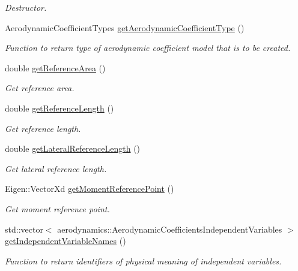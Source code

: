 \begin{DoxyCompactItemize}
\begin{DoxyCompactList}\small\item\em Destructor. \end{DoxyCompactList}\item 
Aerodynamic\+Coefficient\+Types \hyperlink{classtudat_1_1simulation__setup_1_1AerodynamicCoefficientSettings_ac9cdc44679a42e11702489a3720b1e97}{get\+Aerodynamic\+Coefficient\+Type} ()
\begin{DoxyCompactList}\small\item\em Function to return type of aerodynamic coefficient model that is to be created. \end{DoxyCompactList}\item 
double \hyperlink{classtudat_1_1simulation__setup_1_1AerodynamicCoefficientSettings_a435aa9070052b7442625e9ad010e4c57}{get\+Reference\+Area} ()
\begin{DoxyCompactList}\small\item\em Get reference area. \end{DoxyCompactList}\item 
double \hyperlink{classtudat_1_1simulation__setup_1_1AerodynamicCoefficientSettings_a1332da808b8afe7418344d4009904427}{get\+Reference\+Length} ()
\begin{DoxyCompactList}\small\item\em Get reference length. \end{DoxyCompactList}\item 
double \hyperlink{classtudat_1_1simulation__setup_1_1AerodynamicCoefficientSettings_a22915d5cfb8a662caf82b7ac082d7368}{get\+Lateral\+Reference\+Length} ()
\begin{DoxyCompactList}\small\item\em Get lateral reference length. \end{DoxyCompactList}\item 
Eigen\+::\+Vector\+Xd \hyperlink{classtudat_1_1simulation__setup_1_1AerodynamicCoefficientSettings_a16b2b67e431df72bc0267189dd0dd4cc}{get\+Moment\+Reference\+Point} ()
\begin{DoxyCompactList}\small\item\em Get moment reference point. \end{DoxyCompactList}\item 
std\+::vector$<$ aerodynamics\+::\+Aerodynamic\+Coefficients\+Independent\+Variables $>$ \hyperlink{classtudat_1_1simulation__setup_1_1AerodynamicCoefficientSettings_a884a3349c41d023ab72e7566053227aa}{get\+Independent\+Variable\+Names} ()
\begin{DoxyCompactList}\small\item\em Function to return identifiers of physical meaning of independent variables. \end{DoxyCompactList}\item 

\end{DoxyCompactItemize}
